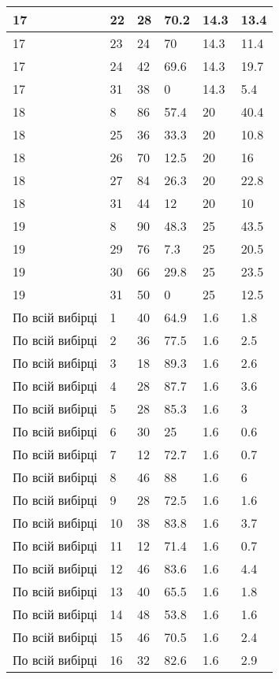 \begin{longtable}[c]{ | p{2cm} | p{2cm} | p{2cm} | p{2cm} | p{3cm} | p{3cm} | }
	\hline
	17 & 22 & 28 & 70.2 & 14.3 & 13.4 \\
	\hline
	17 & 23 & 24 & 70 & 14.3 & 11.4 \\
	\hline
	17 & 24 & 42 & 69.6 & 14.3 & 19.7 \\
	\hline
	17 & 31 & 38 & 0 & 14.3 & 5.4 \\
	\hline
	\hline
	\hline
	18 & 8 & 86 & 57.4 & 20 & 40.4 \\
	\hline
	18 & 25 & 36 & 33.3 & 20 & 10.8 \\
	\hline
	18 & 26 & 70 & 12.5 & 20 & 16 \\
	\hline
	18 & 27 & 84 & 26.3 & 20 & 22.8 \\
	\hline
	18 & 31 & 44 & 12 & 20 & 10 \\
	\hline
	\hline
	\hline
	19 & 8 & 90 & 48.3 & 25 & 43.5 \\
	\hline
	19 & 29 & 76 & 7.3 & 25 & 20.5 \\
	\hline
	19 & 30 & 66 & 29.8 & 25 & 23.5 \\
	\hline
	19 & 31 & 50 & 0 & 25 & 12.5 \\
	\hline
	\hline
	\hline
	По всій вибірці & 1 & 40 & 64.9 & 1.6 & 1.8 \\
	\hline
	По всій вибірці & 2 & 36 & 77.5 & 1.6 & 2.5 \\
	\hline
	По всій вибірці & 3 & 18 & 89.3 & 1.6 & 2.6 \\
	\hline
	По всій вибірці & 4 & 28 & 87.7 & 1.6 & 3.6 \\
	\hline
	По всій вибірці & 5 & 28 & 85.3 & 1.6 & 3 \\
	\hline
	По всій вибірці & 6 & 30 & 25 & 1.6 & 0.6 \\
	\hline
	По всій вибірці & 7 & 12 & 72.7 & 1.6 & 0.7 \\
	\hline
	По всій вибірці & 8 & 46 & 88 & 1.6 & 6 \\
	\hline
	По всій вибірці & 9 & 28 & 72.5 & 1.6 & 1.6 \\
	\hline
	По всій вибірці & 10 & 38 & 83.8 & 1.6 & 3.7 \\
	\hline
	По всій вибірці & 11 & 12 & 71.4 & 1.6 & 0.7 \\
	\hline
	По всій вибірці & 12 & 46 & 83.6 & 1.6 & 4.4 \\
	\hline
	По всій вибірці & 13 & 40 & 65.5 & 1.6 & 1.8 \\
	\hline
	По всій вибірці & 14 & 48 & 53.8 & 1.6 & 1.6 \\
	\hline
	По всій вибірці & 15 & 46 & 70.5 & 1.6 & 2.4 \\
	\hline
	По всій вибірці & 16 & 32 & 82.6 & 1.6 & 2.9 \\

\end{longtable}
